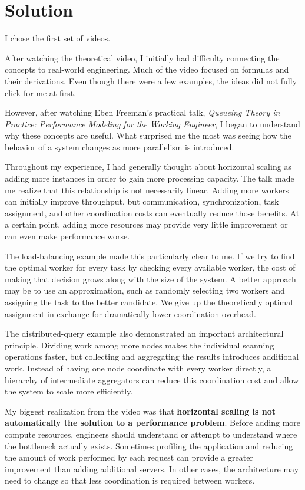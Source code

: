 \newpage
\section{Solution}

I chose the first set of videos.

After watching the theoretical video, I initially had difficulty connecting the
concepts to real-world engineering. Much of the video focused on formulas and
their derivations. Even though there were a few examples, the ideas did not
fully click for me at first.

However, after watching Eben Freeman's practical talk, \textit{Queueing Theory
in Practice: Performance Modeling for the Working Engineer}, I began to
understand why these concepts are useful. What surprised me the most was seeing
how the behavior of a system changes as more parallelism is introduced.

Throughout my experience, I had generally thought about horizontal scaling as
adding more instances in order to gain more processing capacity. The talk made
me realize that this relationship is not necessarily linear. Adding more workers
can initially improve throughput, but communication, synchronization, task
assignment, and other coordination costs can eventually reduce those benefits.
At a certain point, adding more resources may provide very little improvement or
can even make performance worse.

The load-balancing example made this particularly clear to me. If we try to find
the optimal worker for every task by checking every available worker, the cost
of making that decision grows along with the size of the system. A better
approach may be to use an approximation, such as randomly selecting two workers
and assigning the task to the better candidate. We give up the theoretically
optimal assignment in exchange for dramatically lower coordination overhead.

The distributed-query example also demonstrated an important architectural
principle. Dividing work among more nodes makes the individual scanning
operations faster, but collecting and aggregating the results introduces
additional work. Instead of having one node coordinate with every worker
directly, a hierarchy of intermediate aggregators can reduce this coordination
cost and allow the system to scale more efficiently.

My biggest realization from the video was that \textbf{horizontal scaling is not
automatically the solution to a performance problem}. Before adding more compute
resources, engineers should understand or attempt to understand where the
bottleneck actually exists. Sometimes profiling the application and reducing the
amount of work performed by each request can provide a greater improvement than
adding additional servers. In other cases, the architecture may need to change
so that less coordination is required between workers.

